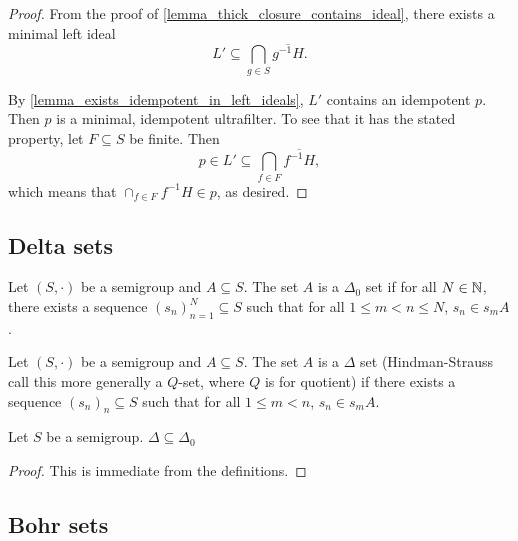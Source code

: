 \begin{proof}
    From the proof of \cref{lemma_thick_closure_contains_ideal}, there exists a minimal left ideal
    \[L' \subseteq \bigcap_{g \in S} \overline{g^{-1}H}.\]

    By \cref{lemma_exists_idempotent_in_left_ideals}, $L'$ contains an idempotent $p$.  Then $p$ is a minimal, idempotent ultrafilter.  To see that it has the stated property, let $F \subseteq S$ be finite.  Then
    \[p \in L' \subseteq \bigcap_{f \in F} \overline{f^{-1} H},\]
    which means that $\cap_{f \in F} f^{-1} H \in p$, as desired.
\end{proof}

\subsection{Delta sets}

\begin{definition}
\leanok{}
Let $(S,\cdot)$ be a semigroup and $A \subseteq S$.
The set $A$ is a $\Delta_0$ set if for all $N \in \mathbb{N}$, there exists a sequence $(s_n)_{n=1}^N \subseteq S$ such that for all $1 \leq m < n \leq N$, $s_n \in s_m A$.
\end{definition}

\begin{definition}
\leanok{}
Let $(S,\cdot)$ be a semigroup and $A \subseteq S$. The set $A$ is a $\Delta$ set (Hindman-Strauss call this more generally a $Q$-set, where $Q$ is for quotient) if there exists a sequence $(s_n)_n \subseteq S$ such that for all $1 \leq m < n$, $s_n \in s_m A$.
\end{definition}

\begin{theorem}
    \label{thm_delta_in_deltazero}
    \leanok{}
    Let $S$ be a semigroup.  $\Delta \subseteq \Delta_0$
\end{theorem}

\begin{proof}
\leanok{}
    This is immediate from the definitions.
\end{proof}

\subsection{Bohr sets}


